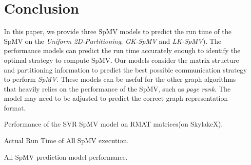 \documentclass[sigconf,review,anonymous]{acmart}
\begin{document}
\section{Conclusion}
In this paper, we provide three SpMV models to predict the run time of the
SpMV on the \textit{Uniform 2D-Partitioning}, \textit{GK-SpMV} and \textit{LK-SpMV}). 
The performance models can predict the run time accurately enough to identify the
optimal strategy to compute SpMV. Our models consider the matrix structure and partitioning information to 
predict the best possible communication strategy to perform
\textit{SpMV}. These models can be useful for the other graph
algorithms that heavily relies on the performance of the SpMV, such as
\textit{page rank}. The model may need to be adjusted to predict the
correct graph representation format.




\begin{table}
\caption{Performance of the SVR SpMV model on RMAT matrices(on SkylakeX).}
\label{tab:performance_table_rmat}
\let\center\empty
\let\endcenter\relax
\centering
\resizebox{.99\width}{!}{}
\end{table}


\begin{table}
\caption{Actual Run Time of All SpMV execution.}
\label{tab:actual_time_table}
\let\center\empty
\let\endcenter\relax
\centering
\resizebox{.88\width}{!}{}
\end{table}

\begin{table}
\caption{All SpMV prediction model performance.}
\label{tab:performance_table}
\let\center\empty
\let\endcenter\relax
\centering
\resizebox{.58\width}{!}{}


\end{table}




\end{document}
